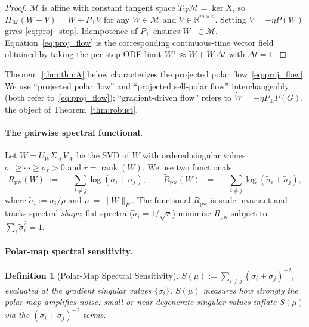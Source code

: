 \documentclass{article}
\newtheorem{definition}{Definition}
\begin{document}
\begin{proof}
$\mathcal M$ is affine with constant tangent space $T_W\mathcal M=\ker X$, so $\Pi_{\mathcal M}(W+V)=W+P_\perp V$ for any $W\in\mathcal M$ and $V\in\mathbb R^{m\times n}$. Setting $V=-\eta P(W)$ gives \eqref{eq:proj_step}. Idempotence of $P_\perp$ ensures $W^+\in\mathcal M$. Equation~\eqref{eq:proj_flow} is the corresponding continuous-time vector field obtained by taking the per-step ODE limit $W^+ \approx W + \dot W\,\Delta t$ with $\Delta t = 1$.
\end{proof}

Theorem~\ref{thm:thmA} below characterizes the projected polar flow~\eqref{eq:proj_flow}. We use ``projected polar flow'' and ``projected self-polar flow'' interchangeably (both refer to~\eqref{eq:proj_flow}); ``gradient-driven flow'' refers to $\dot W=-\eta P_\perp P(G)$, the object of Theorem~\ref{thm:robust}.

\paragraph{The pairwise spectral functional.}
Let $W=U_W\Sigma_W V_W^\top$ be the SVD of $W$ with ordered singular values $\sigma_1\geq\cdots\geq\sigma_r>0$ and $r=\operatorname{rank}(W)$. We use two functionals:
\begin{equation}
R_{\mathrm{pw}}(W) \;:=\; -\sum_{i\neq j}\log(\sigma_i+\sigma_j),
\qquad
\widetilde R_{\mathrm{pw}}(W) \;:=\; -\sum_{i\neq j}\log(\widetilde\sigma_i+\widetilde\sigma_j),
\label{eq:Rpw}
\end{equation}
where $\widetilde\sigma_i:=\sigma_i/\rho$ and $\rho:=\|W\|_F$. The functional $\widetilde R_{\mathrm{pw}}$ is scale-invariant and tracks spectral \emph{shape}; flat spectra ($\widetilde\sigma_i=1/\sqrt r$) minimize $\widetilde R_{\mathrm{pw}}$ subject to $\sum_i\widetilde\sigma_i^2=1$.

\paragraph{Polar-map spectral sensitivity.}
\begin{definition}[Polar-Map Spectral Sensitivity]
\label{def:smu}
$S(\mu):=\sum_{i\neq j}(\sigma_i+\sigma_j)^{-2}$, evaluated at the gradient singular values $\{\sigma_i\}$. $S(\mu)$ measures how strongly the polar map amplifies noise: small or near-degenerate singular values inflate $S(\mu)$ via the $(\sigma_i+\sigma_j)^{-2}$ terms.
\end{definition}
\end{document}
